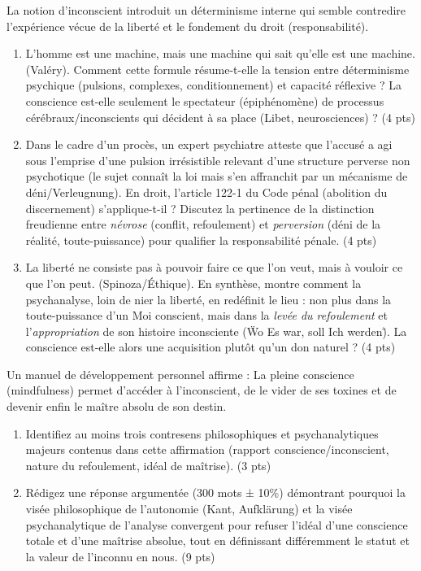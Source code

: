 \documentclass[11pt]{article}
\begin{document}
\begin{exercice}
La notion d'inconscient introduit un déterminisme interne qui semble contredire l'expérience vécue de la liberté et le fondement du droit (responsabilité).
\begin{enumerate}
    \item \og L'homme est une machine, mais une machine qui sait qu'elle est une machine.\fg{} (Valéry). Comment cette formule résume-t-elle la tension entre déterminisme psychique (pulsions, complexes, conditionnement) et capacité réflexive ? La conscience est-elle seulement le \og spectateur\fg{} (épiphénomène) de processus cérébraux/inconscients qui décident à sa place (Libet, neurosciences) ? (4 pts)
    \item Dans le cadre d'un procès, un expert psychiatre atteste que l'accusé a agi sous l'emprise d'une \og pulsion irrésistible\fg{} relevant d'une structure perverse non psychotique (le sujet connaît la loi mais s'en affranchit par un mécanisme de déni/Verleugnung). En droit, l'article 122-1 du Code pénal (abolition du discernement) s'applique-t-il ? Discutez la pertinence de la distinction freudienne entre \textit{névrose} (conflit, refoulement) et \textit{perversion} (déni de la réalité, toute-puissance) pour qualifier la responsabilité pénale. (4 pts)
    \item \og La liberté ne consiste pas à pouvoir faire ce que l'on veut, mais à vouloir ce que l'on peut.\fg{} (Spinoza/Éthique). En synthèse, montre comment la psychanalyse, loin de nier la liberté, en redéfinit le lieu : non plus dans la toute-puissance d'un Moi conscient, mais dans la \textit{levée du refoulement} et l'\textit{appropriation} de son histoire inconsciente (\"Wo Es war, soll Ich werden\"). La conscience est-elle alors une \og acquisition\fg{} plutôt qu'un don naturel ? (4 pts)
\end{enumerate}
\end{exercice}

\begin{exercice}
Un manuel de développement personnel affirme : \og La pleine conscience (mindfulness) permet d'accéder à l'inconscient, de le vider de ses toxines et de devenir enfin le maître absolu de son destin.\fg{}
\begin{enumerate}
    \item Identifiez au moins trois contresens philosophiques et psychanalytiques majeurs contenus dans cette affirmation (rapport conscience/inconscient, nature du refoulement, idéal de maîtrise). (3 pts)
    \item Rédigez une réponse argumentée (300 mots ± 10\%) démontrant pourquoi la visée philosophique de l'autonomie (Kant, Aufklärung) et la visée psychanalytique de l'analyse convergent pour refuser l'idéal d'une \og conscience totale\fg{} et d'une \og maîtrise absolue\fg{}, tout en définissant différemment le statut et la valeur de l'inconnu en nous. (9 pts)
\end{enumerate}
\end{exercice}
\end{document}
